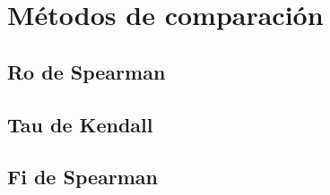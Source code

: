 \section{Métodos de comparación}

\subsection*{Ro de Spearman}



\subsection*{Tau de Kendall}



\subsection*{Fi de Spearman}




